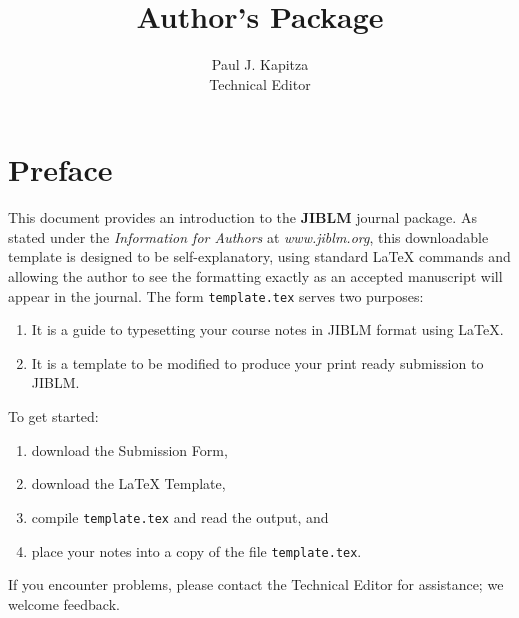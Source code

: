 \documentclass[oneside]{book}
\begin{document}
\large
\frontmatter
\title{Author's Package }
\author{Paul J. Kapitza \\ Technical Editor}
\maketitle
\tableofcontents

\chapter{Preface}

This document provides an introduction to the \textbf{JIBLM} journal package.
As stated under the \emph{Information for Authors} at \emph{www.jiblm.org},
this downloadable template is designed to be self-explanatory,
using standard LaTeX commands and allowing the author to see the formatting exactly as
an accepted manuscript will appear in the journal.  The form \texttt{template.tex} serves two purposes:
\begin{enumerate}
\item It is a guide to typesetting your course notes in JIBLM format using \LaTeX.
\item It is a template to be modified to produce your print ready submission to JIBLM.
\end{enumerate}

\noindent
To get started:
\begin{enumerate}
\item download the Submission Form,
\item download the LaTeX Template,
\item compile \texttt{template.tex} and read the output, and
\item place your notes into a copy of the file \texttt{template.tex}.
\end{enumerate}

\noindent
If you encounter problems, please contact the Technical Editor for assistance;
we welcome feedback.




\end{document}

